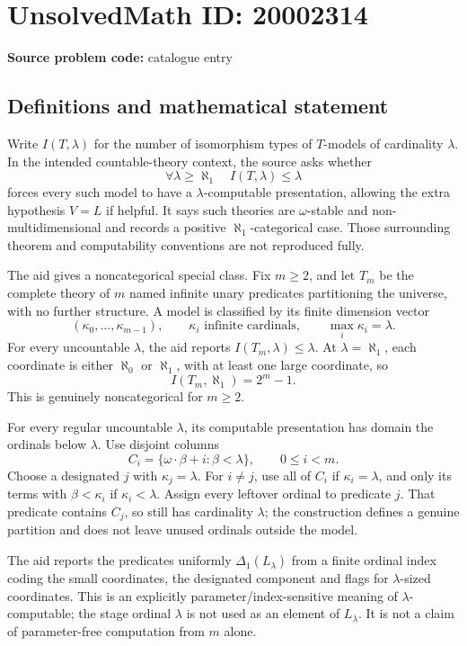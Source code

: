 \documentclass[11pt]{article}
\begin{document}
\section*{UnsolvedMath ID: 20002314}
\textbf{Source problem code:} catalogue entry
\subsection{Definitions and mathematical statement}
Write \(I(T,\lambda)\) for the number of isomorphism types of \(T\)-models of cardinality \(\lambda\). In the intended countable-theory context, the source asks whether
\[
 \forall\lambda\geq\aleph_1\quad I(T,\lambda)\leq\lambda
\]
forces every such model to have a \(\lambda\)-computable presentation, allowing the extra hypothesis \(V=L\) if helpful. It says such theories are \(\omega\)-stable and non-multidimensional and records a positive \(\aleph_1\)-categorical case. Those surrounding theorem and computability conventions are not reproduced fully.

The aid gives a noncategorical special class. Fix \(m\geq2\), and let \(T_m\) be the complete theory of \(m\) named infinite unary predicates partitioning the universe, with no further structure. A model is classified by its finite dimension vector
\[
 (\kappa_0,\ldots,\kappa_{m-1}),\qquad
 \kappa_i\text{ infinite cardinals},\qquad\max_i\kappa_i=\lambda.
\]
For every uncountable \(\lambda\), the aid reports \(I(T_m,\lambda)\leq\lambda\). At \(\lambda=\aleph_1\), each coordinate is either \(\aleph_0\) or \(\aleph_1\), with at least one large coordinate, so
\[
 I(T_m,\aleph_1)=2^m-1.
\]
This is genuinely noncategorical for \(m\geq2\).

For every regular uncountable \(\lambda\), its computable presentation has domain the ordinals below \(\lambda\). Use disjoint columns
\[
 C_i=\{\omega\cdot\beta+i:\beta<\lambda\},\qquad0\leq i<m.
\]
Choose a designated \(j\) with \(\kappa_j=\lambda\). For \(i\ne j\), use all of \(C_i\) if \(\kappa_i=\lambda\), and only its terms with \(\beta<\kappa_i\) if \(\kappa_i<\lambda\). Assign every leftover ordinal to predicate \(j\). That predicate contains \(C_j\), so still has cardinality \(\lambda\); the construction defines a genuine partition and does not leave unused ordinals outside the model.

The aid reports the predicates uniformly \(\Delta_1(L_\lambda)\) from a finite ordinal index coding the small coordinates, the designated component and flags for \(\lambda\)-sized coordinates. This is an explicitly parameter/index-sensitive meaning of \(\lambda\)-computable; the stage ordinal \(\lambda\) is not used as an element of \(L_\lambda\). It is not a claim of parameter-free computation from \(m\) alone.
\end{document}
